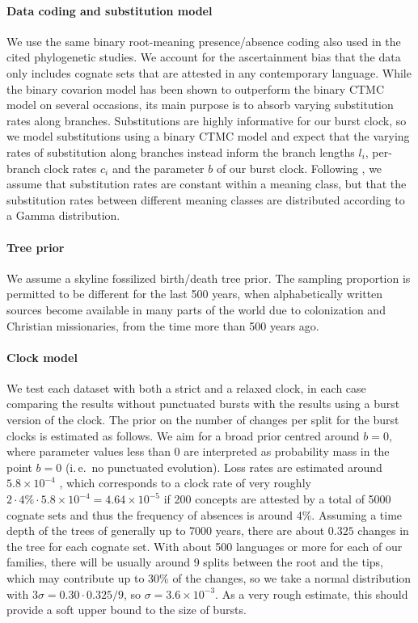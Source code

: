 \documentclass[a4paper,12pt]{scrartcl}
\begin{document}
\paragraph{Data coding and substitution model}
We use the same binary root-meaning presence/absence coding also used in the
cited phylogenetic studies. We account for the ascertainment bias that the data
only includes cognate sets that are attested in any contemporary language.
While the binary covarion model has been shown to outperform the binary CTMC
model on several occasions, its main purpose is to absorb varying substitution
rates along branches. Substitutions are highly informative for our burst clock,
so we model substitutions using a binary CTMC model and expect that the varying
rates of substitution along branches instead inform the branch lengths $l_i$,
per-branch clock rates $c_i$ and the parameter $b$ of our burst clock.
Following \textcite{maurits2017beastling}, we assume that substitution rates are constant within a
meaning class, but that the substitution rates between different meaning classes
are distributed according to a Gamma distribution.

\paragraph{Tree prior} We assume a skyline fossilized birth/death tree prior.
The sampling proportion is permitted to be different for the last 500 years,
when alphabetically written sources become available in many parts of the world
due to colonization and Christian missionaries, from the time more than 500 years ago.

\paragraph{Clock model}
We test each dataset with both a strict and a relaxed clock, in each case
comparing the results without punctuated bursts with the results
using a burst version of the clock. The prior on the number of changes per split for the 
burst clocks is estimated as follows. We aim for a broad prior centred around $b=0$,
where parameter values less than 0 are interpreted as probability mass in the point $b=0$ (i.\,e.\ no punctuated evolution).
Loss rates are estimated around $5.8 × 10^{-4}$ \parencite[405]{pagel2000history}, which
corresponds to a clock rate of very roughly $2 \cdot 4\% \cdot 5.8 × 10^{-4}=4.64\times 10^{-5}$
if 200 concepts are attested by a total of 5000 cognate sets and thus the frequency of absences is around 4\%.
Assuming a time depth of the trees of generally up to 7000 years,
there are about $0.325$ changes in the tree for each cognate set. With about 500 languages or more for each of our 
families, there will be usually around 9 splits between the root and the
tips, which may contribute up to 30\% \parencite{atkinson2008languages} of the changes, so we take a
normal distribution with $3\sigma = 0.30 \cdot 0.325 / 9$, so $\sigma=3.6 \times 10^{-3}$.
As a very rough estimate, this should provide a soft upper bound to the size of bursts.
\end{document}
